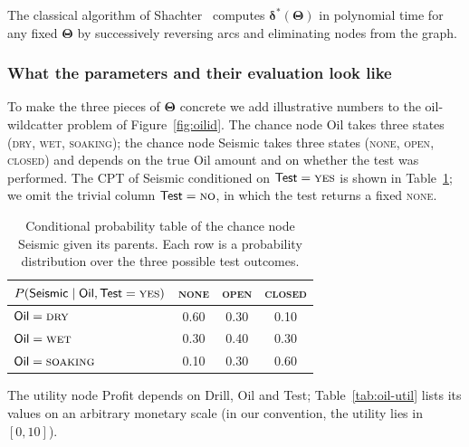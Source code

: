 \noindent The classical algorithm of
Shachter~\cite{shachter1986evaluating} computes
$\boldsymbol{\delta}^{\!*}(\boldsymbol{\Theta})$ in polynomial time
for any fixed $\boldsymbol{\Theta}$ by successively reversing arcs
and eliminating nodes from the graph.

\subsubsection*{What the parameters and their evaluation look like}
\label{sec:oil-tables}

To make the three pieces of $\boldsymbol{\Theta}$ concrete we add
illustrative numbers to the oil-wildcatter problem of
Figure~\ref{fig:oilid}. The chance node \textsf{Oil} takes three
states (\textsc{dry}, \textsc{wet}, \textsc{soaking}); the chance
node \textsf{Seismic} takes three states (\textsc{none},
\textsc{open}, \textsc{closed}) and depends on the true \textsf{Oil}
amount and on whether the test was performed. The CPT of
\textsf{Seismic} conditioned on $\mathsf{Test}=\textsc{yes}$ is shown
in Table~\ref{tab:oil-cpt}; we omit the trivial column
$\mathsf{Test}=\textsc{no}$, in which the test returns a fixed
\textsc{none}.

\begin{table}[H]
\centering\small
\begin{tabular}{l|ccc}
\hline
$P(\mathsf{Seismic} \mid \mathsf{Oil}, \mathsf{Test}=\textsc{yes})$
              & \textsc{none} & \textsc{open} & \textsc{closed} \\
\hline
$\mathsf{Oil}=\textsc{dry}$     & 0.60 & 0.30 & 0.10 \\
$\mathsf{Oil}=\textsc{wet}$     & 0.30 & 0.40 & 0.30 \\
$\mathsf{Oil}=\textsc{soaking}$ & 0.10 & 0.30 & 0.60 \\
\hline
\end{tabular}
\caption{Conditional probability table of the chance node
\textsf{Seismic} given its parents. Each row is a probability
distribution over the three possible test outcomes.}
\label{tab:oil-cpt}
\end{table}

The utility node \textsf{Profit} depends on \textsf{Drill},
\textsf{Oil} and \textsf{Test}; Table~\ref{tab:oil-util} lists its
values on an arbitrary monetary scale (in our convention, the
utility lies in $[0,10]$).

